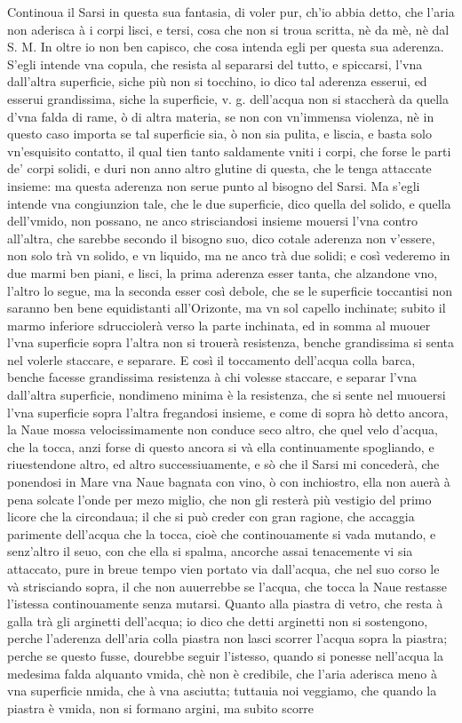 \documentclass[11pt,twoside,openany]{book}
\begin{document}
Continoua il Sarsi in questa sua fantasia, di voler pur, ch'io abbia detto, che l'aria non aderisca à i corpi lisci, e tersi, cosa che non si troua scritta, nè da mè, nè dal S. M. In oltre io non ben capisco, che cosa intenda egli per questa sua aderenza. S'egli intende vna copula, che resista al separarsi del tutto, e spiccarsi, l'vna dall'altra superficie, siche più non si tocchino, io dico tal aderenza esserui, ed esserui grandissima, siche la superficie, v. g. dell'acqua non si staccherà da quella d'vna falda di rame, ò di altra materia, se non con vn'immensa violenza, nè in questo caso importa se tal superficie sia, ò non sia pulita, e liscia, e basta solo vn'esquisito contatto, il qual tien tanto saldamente vniti i corpi, che forse le parti de' corpi solidi, e duri non anno altro glutine di questa, che le tenga attaccate insieme: ma questa aderenza non serue punto al bisogno del Sarsi. Ma s'egli intende vna congiunzion tale, che le due superficie, dico quella del solido, e quella dell'vmido, non possano, ne anco strisciandosi insieme mouersi l'vna contro all'altra, che sarebbe secondo il bisogno suo, dico cotale aderenza non v'essere, non solo trà vn solido, e vn liquido, ma ne anco trà due solidi; e così vederemo in due marmi ben piani, e lisci, la prima aderenza esser tanta, che alzandone vno, l'altro lo segue, ma la seconda esser così debole, che se le superficie toccantisi non saranno ben bene equidistanti all'Orizonte, ma vn sol capello inchinate; subito il marmo inferiore sdrucciolerà verso la parte inchinata, ed in somma al muouer l'vna superficie sopra l'altra non si trouerà resistenza, benche grandissima si senta nel volerle staccare, e separare. E così il toccamento dell'acqua colla barca, benche facesse grandissima resistenza à chi volesse staccare, e separar l'vna dall'altra superficie, nondimeno minima è la resistenza, che si sente nel muouersi l'vna superficie sopra l'altra fregandosi insieme, e come di sopra hò detto ancora, la Naue mossa velocissimamente non conduce seco altro, che quel velo d'acqua, che la tocca, anzi forse di questo ancora si và ella continuamente spogliando, e riuestendone altro, ed altro successiuamente, e sò che il Sarsi mi concederà, che ponendosi in Mare vna Naue bagnata con vino, ò con inchiostro, ella non auerà à pena solcate l'onde per mezo miglio, che non gli resterà più vestigio del primo licore che la circondaua; il che si può creder con gran ragione, che accaggia parimente dell'acqua che la tocca, cioè che continouamente si vada mutando, e senz'altro il seuo, con che ella si spalma, ancorche assai tenacemente vi sia attaccato, pure in breue tempo vien portato via dall'acqua, che nel suo corso le và strisciando sopra, il che non auuerrebbe se l'acqua, che tocca la Naue restasse l'istessa continouamente senza mutarsi. Quanto alla piastra di vetro, che resta à galla trà gli arginetti dell'acqua; io dico che detti arginetti non si sostengono, perche l'aderenza dell'aria colla piastra non lasci scorrer l'acqua sopra la piastra; perche se questo fusse, dourebbe seguir l'istesso, quando si ponesse nell'acqua la medesima falda alquanto vmida, chè non è credibile, che l'aria aderisca meno à vna superficie nmida, che à vna asciutta; tuttauia noi veggiamo, che quando la piastra è vmida, non si formano argini, ma subito scorre 
\end{document}
